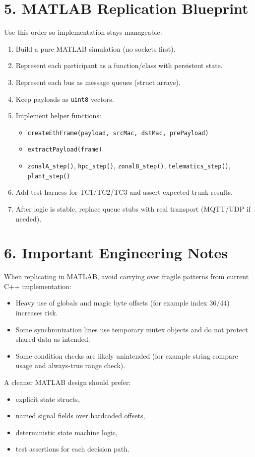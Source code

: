 \documentclass[11pt,a4paper]{article}
\begin{document}
\section*{5. MATLAB Replication Blueprint}
Use this order so implementation stays manageable:
\begin{enumerate}
  \item Build a pure MATLAB simulation (no sockets first).
  \item Represent each participant as a function/class with persistent state.
  \item Represent each bus as message queues (struct arrays).
  \item Keep payloads as \texttt{uint8} vectors.
  \item Implement helper functions:
  \begin{itemize}
    \item \texttt{createEthFrame(payload, srcMac, dstMac, prePayload)}
    \item \texttt{extractPayload(frame)}
    \item \texttt{zonalA\_step()}, \texttt{hpc\_step()}, \texttt{zonalB\_step()}, \texttt{telematics\_step()}, \texttt{plant\_step()}
  \end{itemize}
  \item Add test harness for TC1/TC2/TC3 and assert expected trunk results.
  \item After logic is stable, replace queue stubs with real transport (MQTT/UDP if needed).
\end{enumerate}

\section*{6. Important Engineering Notes}
When replicating in MATLAB, avoid carrying over fragile patterns from current C++ implementation:
\begin{itemize}
  \item Heavy use of globals and magic byte offsets (for example index 36/44) increases risk.
  \item Some synchronization lines use temporary mutex objects and do not protect shared data as intended.
  \item Some condition checks are likely unintended (for example string compare usage and always-true range check).
\end{itemize}

A cleaner MATLAB design should prefer:
\begin{itemize}
  \item explicit state structs,
  \item named signal fields over hardcoded offsets,
  \item deterministic state machine logic,
  \item test assertions for each decision path.
\end{itemize}
\end{document}
